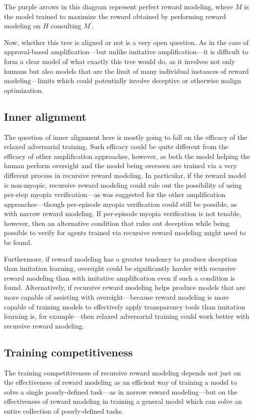 \documentclass[
  onecolumn,
  natbib,
]{miri-tech-article}
\begin{document}
\vspace{2mm}

\noindent The purple arrows in this diagram represent perfect reward modeling, where $M$ is the model trained to maximize the reward obtained by performing reward modeling on $H$ consulting $M^\prime$.

Now, whether this tree is aligned or not is a very open question. As in the case of approval-based amplification---but unlike imitative amplification---it is difficult to form a clear model of what exactly this tree would do, as it involves not only humans but also models that are the limit of many individual instances of reward modeling---limits which could potentially involve deceptive or otherwise malign optimization.

\subsection{Inner alignment} The question of inner alignment here is mostly going to fall on the efficacy of the relaxed adversarial training. Such efficacy could be quite different from the efficacy of other amplification approaches, however, as both the model helping the human perform oversight and the model being overseen are trained via a very different process in recursive reward modeling. In particular, if the reward model is non-myopic, recursive reward modeling could rule out the possibility of using per-step myopia verification---as was suggested for the other amplification approaches---though per-episode myopia verification could still be possible, as with narrow reward modeling. If per-episode myopia verification is not tenable, however, then an alternative condition that rules out deception while being possible to verify for agents trained via recursive reward modeling might need to be found.

Furthermore, if reward modeling has a greater tendency to produce deception than imitation learning, oversight could be significantly harder with recursive reward modeling than with imitative amplification even if such a condition is found. Alternatively, if recursive reward modeling helps produce models that are more capable of assisting with oversight---because reward modeling is more capable of training models to effectively apply transparency tools than imitation learning is, for example---then relaxed adversarial training could work better with recursive reward modeling.

\subsection{Training competitiveness} The training competitiveness of recursive reward modeling depends not just on the effectiveness of reward modeling as an efficient way of training a model to solve a single poorly-defined task---as in narrow reward modeling---but on the effectiveness of reward modeling in training a general model which can solve an entire collection of poorly-defined tasks.
\end{document}

